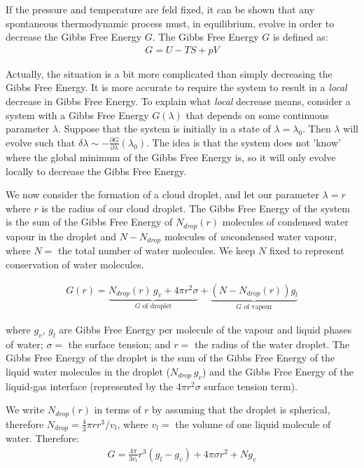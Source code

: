 If the pressure and temperature are feld fixed, it can be shown that any spontaneous thermodynamic process must, in equilibrium, evolve in order to decrease the Gibbs Free Energy $G$. The Gibbs Free Energy $G$ is defined as:
\begin{align}\label{Gibbs}
    G=U-TS+pV
\end{align}

\noindent Actually, the situation is a bit more complicated than simply decreasing the Gibbs Free Energy. It is more accurate to require the system to result in a \textit{local} decrease in Gibbs Free Energy. To explain what \textit{local} decrease means, consider a system with a Gibbs Free Energy $G(\lambda)$ that depends on some continuous parameter $\lambda$. Suppose that the system is initially in a state of $\lambda=\lambda_0$. Then $\lambda$ will evolve such that $\delta \lambda\sim-\frac{\partial G}{\partial \lambda}(\lambda_0)$. The idea is that the system does not 'know' where the global minimum of the Gibbs Free Energy is, so it will only evolve locally to decrease the Gibbs Free Energy.

We now consider the formation of a cloud droplet, and let our parameter $\lambda=r$ where $r$ is the radius of our cloud droplet. The Gibbs Free Energy of the system is the sum of the Gibbs Free Energy of $N_{drop}(r)$ molecules of condensed water vapour in the droplet and $N-N_{drop}$ molecules of \textit{un}condensed water vapour, where $N=$ the total number of water molecules. We keep $N$ fixed to represent conservation of water molecules. 

\begin{align*}
    G(r)=\underbrace{N_{drop}(r)\,g_v+4\pi r^2\sigma}_{G \text{ of droplet}}+\underbrace{(N-N_{drop}(r))g_l}_{G \text{ of vapour}}
\end{align*}

\noindent where $g_v$, $g_l$ are Gibbs Free Energy per molecule of the vapour and liquid phases of water; $\sigma=$ the surface tension; and $r=$ the radius of the water droplet. The Gibbs Free Energy of the droplet is the sum of the Gibbs Free Energy of the liquid water molecules in the droplet ($N_{drop}\,g_v$) and the Gibbs Free Energy of the liquid-gas interface (represented by the $4\pi r^2\sigma$ surface tension term).

We write $N_{drop}(r)$ in terms of $r$ by assuming that the droplet is spherical, therefore $N_{drop}= \frac{4}{3}\pi r r^3/v_l$, where $v_l=$ the volume of one liquid molecule of water. Therefore:
\begin{align}
    G = \frac{4\pi}{3v_l}r^3(g_l-g_v)+4\pi\sigma r^2+Ng_v
\end{align}

